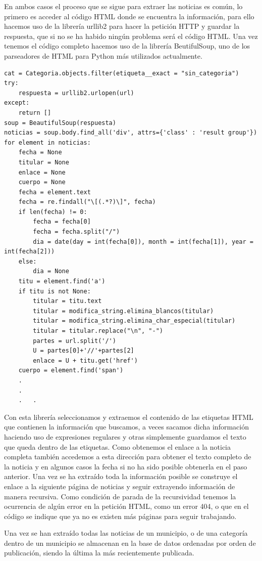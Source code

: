 En ambos casos el proceso que se sigue para extraer las noticias es común, lo primero es acceder al código HTML donde se encuentra la información, para ello hacemos uso de la librería urllib2 para hacer la petición HTTP y guardar la respuesta, que si no se ha habido ningún problema será el código HTML. Una vez tenemos el código completo hacemos uso de la librería BeutifulSoup, uno de los parseadores de HTML para Python más utilizados actualmente. 
\begin{lstlisting}
cat = Categoria.objects.filter(etiqueta__exact = "sin_categoria")
try:
	respuesta = urllib2.urlopen(url)
except:
	return []
soup = BeautifulSoup(respuesta)
noticias = soup.body.find_all('div', attrs={'class' : 'result group'})	
for element in noticias:
	fecha = None
	titular = None
	enlace = None
	cuerpo = None
	fecha = element.text
	fecha = re.findall("\[(.*?)\]", fecha)
	if len(fecha) != 0:
		fecha = fecha[0]
		fecha = fecha.split("/")
		dia = date(day = int(fecha[0]), month = int(fecha[1]), year = int(fecha[2]))
	else:
		dia = None
	titu = element.find('a')
	if titu is not None:
		titular = titu.text
		titular = modifica_string.elimina_blancos(titular)
		titular = modifica_string.elimina_char_especial(titular)
		titular = titular.replace("\n", "-")
		partes = url.split('/')
		U = partes[0]+'//'+partes[2]
		enlace = U + titu.get('href')
	cuerpo = element.find('span')
	.
	.
	.	.
\end{lstlisting}
Con esta librería seleccionamos y extraemos el contenido de las etiquetas HTML que contienen la información que buscamos, a veces  sacamos dicha información haciendo uso de expresiones regulares y otras simplemente guardamos el texto que queda dentro de las etiquetas. Como obtenemos el enlace a la noticia completa también accedemos a esta dirección para obtener el texto completo de la noticia y en algunos casos la fecha si no ha sido posible obtenerla en el paso anterior. Una vez se ha extraído toda la información posible se construye el enlace a la siguiente página de noticias y seguir extrayendo información de manera recursiva. Como condición de parada de la recursividad tenemos la ocurrencia de algún error en la petición HTML, como un error 404, o que en el código se indique que ya no es existen más páginas para seguir trabajando. 

Una vez se han extraído todas las noticias de un municipio, o de una categoría dentro de un municipio se almacenan en la base de datos ordenadas por orden de publicación, siendo la última la más recientemente publicada.

